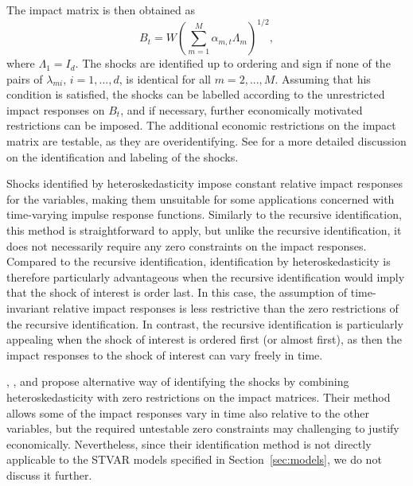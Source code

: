 \documentclass[nojss]{jss}
\begin{document}
The impact matrix is then obtained as
\begin{equation}
B_t=W\left(\sum_{m=1}^M\alpha_{m,t}\Lambda_m\right)^{1/2},
\end{equation}
where $\Lambda_1=I_d$. The shocks are identified up to ordering and sign if none of the pairs of $\lambda_{mi}$, $i=1,...,d$, is identical for all $m=2,...,M$. Assuming that his condition is satisfied, the shocks can be labelled according to the unrestricted impact responses on $B_t$, and if necessary, further economically motivated restrictions can be imposed. The additional economic restrictions on the impact matrix are testable, as they are overidentifying. See \cite{Virolainen:2024} for a more detailed discussion on the identification and labeling of the shocks.

Shocks identified by heteroskedasticity impose constant relative impact responses for the variables, making them unsuitable for some applications concerned with time-varying impulse response functions. Similarly to the recursive identification, this method is straightforward to apply, but unlike the recursive identification, it does not necessarily require any zero constraints on the impact responses. Compared to the recursive identification, identification by heteroskedasticity is therefore particularly advantageous when the recursive identification would imply that the shock of interest is order last. In this case, the assumption of time-invariant relative impact responses is less restrictive than the zero restrictions of the recursive identification. In contrast, the recursive identification is particularly appealing when the shock of interest is ordered first (or almost first), as then the impact responses to the shock of interest can vary freely in time.

\cite{Bacchiocchi+Fanelli:2015}, \cite{Bacchiocchi+Castelnuovo+Fanelli:2016}, and \cite{Angelini+Bacchiocchi+Caggiano+Fanelli:2019} propose alternative way of identifying the shocks by combining heteroskedasticity with zero restrictions on the impact matrices. Their method allows some of the impact responses vary in time also relative to the other variables, but the required untestable zero constraints may challenging to justify economically. Nevertheless, since their identification method is not directly applicable to the STVAR models specified in Section~\ref{sec:models}, we do not discuss it further.
\end{document}
